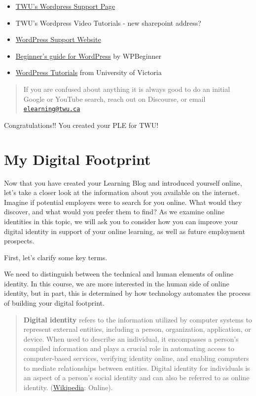 \documentclass[
]{book}
\theoremstyle{definition}
\theoremstyle{definition}
\theoremstyle{definition}
\theoremstyle{definition}
\theoremstyle{remark}
\begin{document}
\begin{reflect}
\begin{itemize}
\item
  \href{https://www.twu.ca/academics/academic-professional-support/online-learning-resources/wordpress}{TWU's Wordpress Support Page}
\item
  TWU's Wordpress Video Tutorials - new sharepoint address?
\item
  \href{https://wordpress.com/support/}{WordPress Support Website}
\item
  \href{https://www.wpbeginner.com/start-here/}{Beginner's guide for WordPress} by WPBeginner
\item
  \href{https://onlineacademiccommunity.uvic.ca/wordpress-tutorials/}{WordPress Tutorials} from University of Victoria
\end{itemize}

\begin{quote}
If you are confused about anything it is always good to do an initial Google or YouTube search, reach out on Discourse, or email \href{mailto:elearning@twu.ca}{\nolinkurl{elearning@twu.ca}}
\end{quote}
\end{reflect}

Congratulations!! You created your PLE for TWU!

\hypertarget{my-digital-footprint}{%
\section{My Digital Footprint}\label{my-digital-footprint}}

Now that you have created your Learning Blog and introduced yourself online, let's take a closer look at the information about you available on the internet. Imagine if potential employers were to search for you online. What would they discover, and what would you prefer them to find? As we examine online identities in this topic, we will ask you to consider how you can improve your digital identity in support of your online learning, as well as future employment prospects.

First, let's clarify some key terms.

We need to distinguish between the technical and human elements of online identity. In this course, we are more interested in the human side of online identity, but in part, this is determined by how technology automates the process of building your digital footprint.

\begin{quote}
\textbf{Digital identity} refers to the information utilized by computer systems to represent external entities, including a person, organization, application, or device. When used to describe an individual, it encompasses a person's compiled information and plays a crucial role in automating access to computer-based services, verifying identity online, and enabling computers to mediate relationships between entities. Digital identity for individuals is an aspect of a person's social identity and can also be referred to as online identity. (\href{https://en.wikipedia.org/wiki/Digital_identity}{Wikipedia}: Online).
\end{quote}
\end{document}
